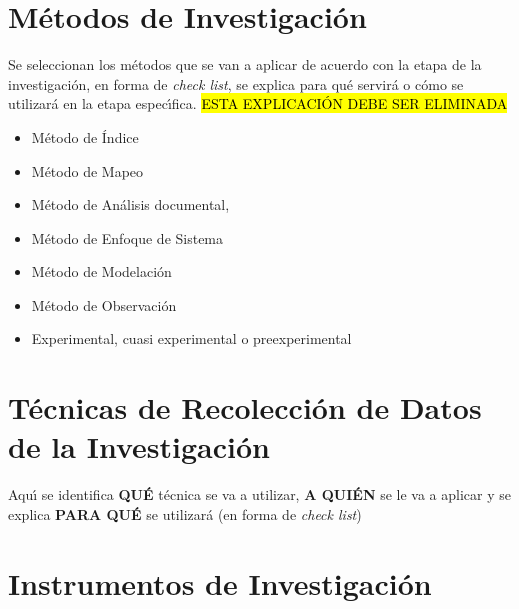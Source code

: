 \section{M\'{e}todos de Investigaci\'{o}n}
\label{cap2:sec:metodos_de_investigacion}

Se seleccionan los m\'{e}todos que se van a aplicar de acuerdo con la etapa de la investigaci\'{o}n, 
en forma de \textit{check list}, se explica para qu\'{e} servir\'{a} o c\'{o}mo se utilizar\'{a} en la etapa 
espec\'{\i}fica. \hl{ESTA EXPLICACI\'{O}N DEBE SER ELIMINADA} 

\begin{itemize}
\item M\'{e}todo de \'{I}ndice  

\item M\'{e}todo de Mapeo 

\item M\'{e}todo de An\'{a}lisis documental,  

\item M\'{e}todo de Enfoque de Sistema 

\item M\'{e}todo de Modelaci\'{o}n 

\item M\'{e}todo de Observaci\'{o}n 

\item Experimental, cuasi experimental o preexperimental 
\end{itemize}

\section{T\'ecnicas de Recolecci\'on de Datos de la Investigaci\'on }
\label{cap2:sec:tecnicas_de_recoleccion_de_datos_de_la_investigacion }

Aqu\'{\i} se identifica \textbf{QU\'{E}} t\'{e}cnica se va a utilizar, \textbf{A QUI\'{E}N} se le 
va a aplicar y se explica \textbf{PARA QU\'{E}} se utilizar\'{a} (en forma de \textit{check list})  



\section{Instrumentos de Investigaci\'{o}n}
\label{cap2:sec:instrumentos_de_investigacion}


